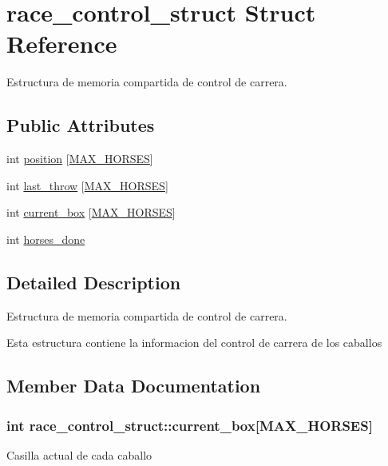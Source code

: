 \hypertarget{structrace__control__struct}{}\section{race\+\_\+control\+\_\+struct Struct Reference}
\label{structrace__control__struct}


Estructura de memoria compartida de control de carrera.  


\subsection*{Public Attributes}
\begin{DoxyCompactItemize}
\item 
int \hyperlink{structrace__control__struct_aa99101cd69a20dcdd9f3322cf272d434}{position} \mbox{[}\hyperlink{proyecto_8c_a1f292d5e7fb89ea56519859a22db34c6}{M\+A\+X\+\_\+\+H\+O\+R\+S\+ES}\mbox{]}
\item 
int \hyperlink{structrace__control__struct_ad0803685a1d1a4e56e8a2af52a70ef7e}{last\+\_\+throw} \mbox{[}\hyperlink{proyecto_8c_a1f292d5e7fb89ea56519859a22db34c6}{M\+A\+X\+\_\+\+H\+O\+R\+S\+ES}\mbox{]}
\item 
int \hyperlink{structrace__control__struct_a739b57a39c850d267de155e8c866bd23}{current\+\_\+box} \mbox{[}\hyperlink{proyecto_8c_a1f292d5e7fb89ea56519859a22db34c6}{M\+A\+X\+\_\+\+H\+O\+R\+S\+ES}\mbox{]}
\item 
int \hyperlink{structrace__control__struct_a86354e834c5267f502b144c10cf45570}{horses\+\_\+done}
\end{DoxyCompactItemize}


\subsection{Detailed Description}
Estructura de memoria compartida de control de carrera. 

Esta estructura contiene la informacion del control de carrera de los caballos 

\subsection{Member Data Documentation}
\subsubsection[{\texorpdfstring{current\+\_\+box}{current_box}}]{\setlength{\rightskip}{0pt plus 5cm}int race\+\_\+control\+\_\+struct\+::current\+\_\+box\mbox{[}{\bf M\+A\+X\+\_\+\+H\+O\+R\+S\+ES}\mbox{]}}\hypertarget{structrace__control__struct_a739b57a39c850d267de155e8c866bd23}{}\label{structrace__control__struct_a739b57a39c850d267de155e8c866bd23}
Casilla actual de cada caballo 
